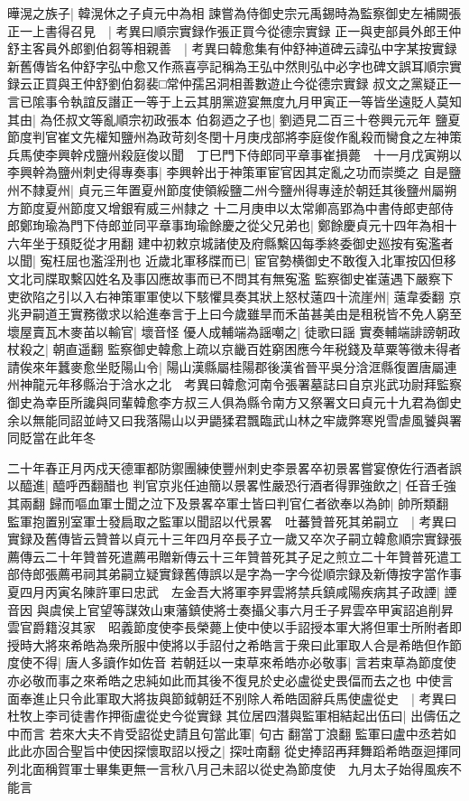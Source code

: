 曄滉之族子|{
	韓滉休之子貞元中為相}
諫嘗為侍御史宗元禹錫時為監察御史左補闕張正一上書得召見　|{
	考異曰順宗實録作張正買今從德宗實録}
正一與吏部員外郎王仲舒主客員外郎劉伯芻等相親善　|{
	考異曰韓愈集有仲舒神道碑云諱弘中字某按實録新舊傳皆名仲舒字弘中愈又作燕喜亭記稱為王弘中然則弘中必字也碑文誤耳順宗實録云正買與王仲舒劉伯芻裴□常仲孺呂洞相善數遊止今從德宗實録}
叔文之黨疑正一言已隂事令執誼反譖正一等于上云其朋黨遊宴無度九月甲寅正一等皆坐遠貶人莫知其由|{
	為伾叔文等亂順宗初政張本}
伯芻迺之子也|{
	劉迺見二百三十卷興元元年}
鹽夏節度判官崔文先權知鹽州為政苛刻冬閏十月庚戌部將李庭俊作亂殺而臠食之左神策兵馬使李興幹戍鹽州殺庭俊以聞　丁巳門下侍郎同平章事崔損薨　十一月戊寅朔以李興幹為鹽州刺史得專奏事|{
	李興幹出于神策軍宦官因其定亂之功而崇奬之}
自是鹽州不隸夏州|{
	貞元三年置夏州節度使領綏鹽二州今鹽州得專逹於朝廷其後鹽州屬朔方節度夏州節度又增銀宥威三州隸之}
十二月庚申以太常卿高郢為中書侍郎吏部侍郎鄭珣瑜為門下侍郎並同平章事珣瑜餘慶之從父兄弟也|{
	鄭餘慶貞元十四年為相十六年坐于䪹貶從才用翻}
建中初敕京城諸使及府縣繫囚每季終委御史廵按有寃濫者以聞|{
	寃枉屈也濫淫刑也}
近歲北軍移牒而已|{
	宦官勢横御史不敢復入北軍按囚但移文北司牒取繫囚姓名及事囚應故事而已不問其有無寃濫}
監察御史崔薳遇下嚴察下吏欲陷之引以入右神策軍軍使以下駭懼具奏其狀上怒杖薳四十流崖州|{
	薳韋委翻}
京兆尹嗣道王實務徵求以給進奉言于上曰今歲雖旱而禾苖甚美由是租税皆不免人窮至壞屋賣瓦木麥苖以輸官|{
	壞音怪}
優人成輔端為謡嘲之|{
	徒歌曰謡}
實奏輔端誹謗朝政杖殺之|{
	朝直遥翻}
監察御史韓愈上疏以京畿百姓窮困應今年税錢及草粟等徵未得者請俟來年蠶麥愈坐貶陽山令|{
	陽山漢縣屬桂陽郡後漢省晉平吳分浛洭縣復置唐屬連州神龍元年移縣治于浛水之北　考異曰韓愈河南令張署墓誌曰自京兆武功尉拜監察御史為幸臣所讒與同輩韓愈李方叔三人俱為縣令南方又祭署文曰貞元十九君為御史余以無能同詔並峙又曰我落陽山以尹鼯猱君飄臨武山林之牢歲弊寒兇雪虐風饕與署同貶當在此年冬}


二十年春正月丙戍天德軍都防禦團練使豐州刺史李景畧卒初景畧嘗宴僚佐行酒者誤以醯進|{
	醯呼西翻醋也}
判官京兆任迪簡以景畧性嚴恐行酒者得罪強飲之|{
	任音壬強其兩翻}
歸而嘔血軍士聞之泣下及景畧卒軍士皆曰判官仁者欲奉以為帥|{
	帥所類翻}
監軍抱置别室軍士發扃取之監軍以聞詔以代景畧　吐蕃贊普死其弟嗣立　|{
	考異曰實録及舊傳皆云贊普以貞元十三年四月卒長子立一歲又卒次子嗣立韓愈順宗實録張薦傳云二十年贊普死遣薦弔贈新傳云十三年贊普死其子足之煎立二十年贊普死遣工部侍郎張薦弔祠其弟嗣立疑實録舊傳誤以是字為一字今從順宗録及新傳按字當作事}
夏四月丙寅名陳許軍曰忠武　左金吾大將軍李昇雲將禁兵鎮咸陽疾病其子政諲|{
	諲音因}
與虞侯上官望等謀效山東藩鎮使將士奏攝父事六月壬子昇雲卒甲寅詔追削昇雲官爵籍沒其家　昭義節度使李長榮薨上使中使以手詔授本軍大將但軍士所附者即授時大將來希皓為衆所服中使將以手詔付之希皓言于衆曰此軍取人合是希皓但作節度使不得|{
	唐人多讀作如佐音}
若朝廷以一束草來希皓亦必敬事|{
	言若束草為節度使亦必敬而事之來希皓之忠純如此而其後不復見於史必盧從史畏偪而去之也}
中使言面奉進止只令此軍取大將抜與節鉞朝廷不别除人希皓固辭兵馬使盧從史　|{
	考異曰杜牧上李司徒書作押衙盧從史今從實録}
其位居四潛與監軍相結起出伍曰|{
	出儔伍之中而言}
若來大夫不肯受詔從史請且句當此軍|{
	句古翻當丁浪翻}
監軍曰盧中丞若如此此亦固合聖旨中使因探懷取詔以授之|{
	探吐南翻}
從史捧詔再拜舞蹈希皓亟迴揮同列北面稱賀軍士畢集更無一言秋八月己未詔以從史為節度使　九月太子始得風疾不能言

